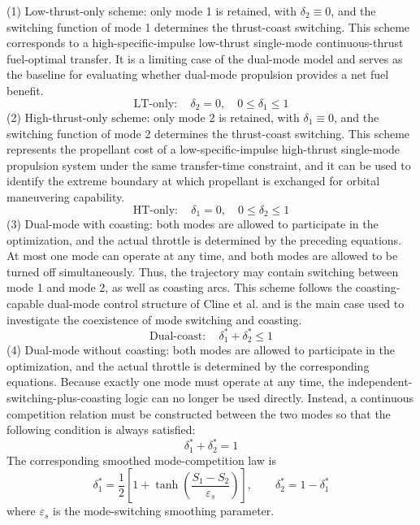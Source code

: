 ﻿\documentclass{IEEEtaes}
\begin{document}
(1) Low-thrust-only scheme: only mode 1 is retained, with $\delta_2\equiv0$, and the switching function of mode 1 determines the thrust-coast switching. This scheme corresponds to a high-specific-impulse low-thrust single-mode continuous-thrust fuel-optimal transfer. It is a limiting case of the dual-mode model and serves as the baseline for evaluating whether dual-mode propulsion provides a net fuel benefit.
\begin{equation}
\text{LT-only}:\quad \delta_2=0,\quad 0\leq\delta_1\leq1
\end{equation}
(2) High-thrust-only scheme: only mode 2 is retained, with $\delta_1\equiv0$, and the switching function of mode 2 determines the thrust-coast switching. This scheme represents the propellant cost of a low-specific-impulse high-thrust single-mode propulsion system under the same transfer-time constraint, and it can be used to identify the extreme boundary at which propellant is exchanged for orbital maneuvering capability.
\begin{equation}
\text{HT-only}:\quad \delta_1=0,\quad 0\leq\delta_2\leq1
\end{equation}
(3) Dual-mode with coasting: both modes are allowed to participate in the optimization, and the actual throttle is determined by the preceding equations. At most one mode can operate at any time, and both modes are allowed to be turned off simultaneously. Thus, the trajectory may contain switching between mode 1 and mode 2, as well as coasting arcs. This scheme follows the coasting-capable dual-mode control structure of Cline et al. \cite{cline2024a} and is the main case used to investigate the coexistence of mode switching and coasting.
\begin{equation}
\text{Dual-coast}:\quad \delta_1^{*}+\delta_2^{*}\leq1
\end{equation}
(4) Dual-mode without coasting: both modes are allowed to participate in the optimization, and the actual throttle is determined by the corresponding equations. Because exactly one mode must operate at any time, the independent-switching-plus-coasting logic can no longer be used directly. Instead, a continuous competition relation must be constructed between the two modes so that the following condition is always satisfied:
\begin{equation}
\delta_1^{*}+\delta_2^{*}=1
\end{equation}
The corresponding smoothed mode-competition law is
\begin{equation}
\delta_1^{*}=\frac{1}{2}\left[1+\tanh\left(\frac{S_1-S_2}{\varepsilon_s}\right)\right],\qquad \delta_2^{*}=1-\delta_1^{*}
\end{equation}
where $\varepsilon_s$ is the mode-switching smoothing parameter.
\end{document}
